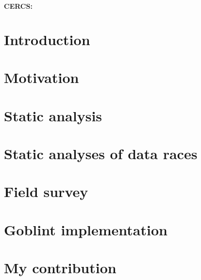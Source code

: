 \documentclass{style/master-thesis}
\begin{document}
\noindent\textbf{CERCS:}





\newpage
\tableofcontents



\section{Introduction}


\pagebreak

\section{Motivation}


\pagebreak


\section{Static analysis} 


\pagebreak

\section{Static analyses of data races}



\section{Field survey}


\pagebreak

\section{Goblint implementation}


\pagebreak


\section{My contribution}


\pagebreak
\end{document}
